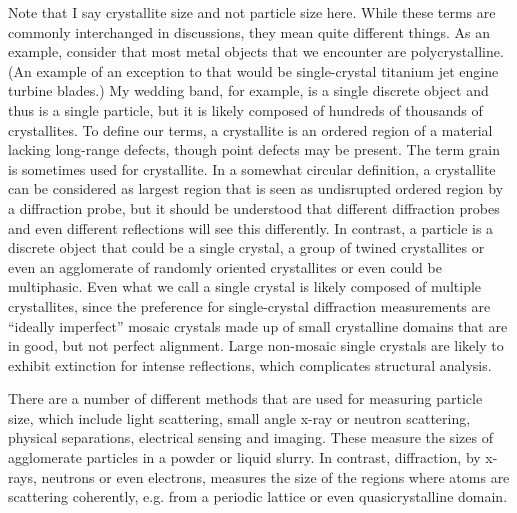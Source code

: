  Note that I say crystallite size and not particle size here. While these terms are commonly interchanged in discussions, they mean quite different things. As an example, consider that most metal objects that we encounter are polycrystalline. (An example of an exception to that would be single-crystal titanium jet engine turbine blades.) My wedding band, for example, is a single discrete object and thus is a single particle, but it is likely composed of hundreds of thousands of crystallites. To define our terms, a crystallite is an ordered region of a material lacking long-range defects, though point defects may be present. The term grain is sometimes used for crystallite. In a somewhat circular definition, a crystallite can be considered as largest region that is seen as undisrupted ordered region by a diffraction probe, but it should be understood that different diffraction probes and even different reflections will see this differently. In contrast, a particle is a discrete object that could be a single crystal, a group of twined crystallites or even an agglomerate of randomly oriented crystallites or even could be multiphasic. Even what we call a single crystal is likely composed of multiple crystallites, since the preference for single-crystal diffraction measurements are “ideally imperfect” mosaic crystals made up of small crystalline domains that are in good, but not perfect alignment. Large non-mosaic single crystals are likely to exhibit extinction for intense reflections, which complicates structural analysis. 

 There are a number of different methods that are used for measuring particle size, which include light scattering, small angle x-ray or neutron scattering, physical separations, electrical sensing and imaging. These measure the sizes of agglomerate particles in a powder or liquid slurry. In contrast, diffraction, by x-rays, neutrons or even electrons, measures the size of the regions where atoms are scattering coherently, e.g. from a periodic lattice or even quasicrystalline domain. 

